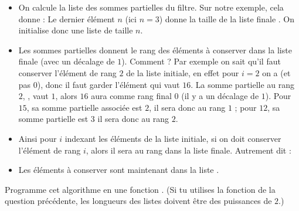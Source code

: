 \documentclass[11pt,class=report,crop=false]{standalone}
\begin{document}
\begin{activite}
\begin{enumerate}
    
    \begin{itemize}
      \item On calcule la liste des sommes partielles du filtre. Sur notre exemple, cela donne :     
      Le dernier élément $n$ (ici $n=3$) donne la taille de la liste finale . On initialise donc une liste  de taille $n$.
      
      \item Les sommes partielles donnent le rang des éléments à conserver dans la liste finale (avec un décalage de $1$). Comment ? 
      Par exemple on sait qu'il faut conserver l'élément de rang $2$ de la liste initiale, en effet pour $i=2$ on a  (et pas $0$), donc il faut garder l'élément  qui vaut $16$. La somme partielle au rang $2$, , vaut $1$, alors $16$ aura comme rang final $0$ (il y a un décalage de $1$). Pour $15$, sa somme partielle associée est $2$, il sera donc au rang $1$ ; pour $12$, sa somme partielle est $3$ il sera donc au rang $2$.      
      
      \item Ainsi pour $i$ indexant les éléments de la liste initiale, si on doit conserver l'élément de rang $i$, alors il sera au rang  dans la liste finale. Autrement dit :
      
      \item Les éléments à conserver sont maintenant dans la liste .
                 
      
     \end{itemize}    
     
     Programme cet algorithme en une fonction . (Si tu utilises la fonction de la question précédente, les longueurs des listes doivent être des puissances de $2$.)
  \end{enumerate}
  
  
     
\end{activite}
\end{document}
